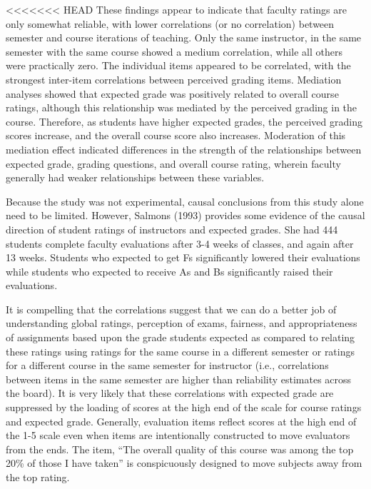\documentclass[man]{apa6}
\theoremstyle{definition}
\theoremstyle{definition}
\theoremstyle{definition}
\theoremstyle{remark}
\begin{document}
<<<<<<< HEAD
These findings appear to indicate that faculty ratings are only somewhat
reliable, with lower correlations (or no correlation) between semester
and course iterations of teaching. Only the same instructor, in the same
semester with the same course showed a medium correlation, while all
others were practically zero. The individual items appeared to be
correlated, with the strongest inter-item correlations between perceived
grading items. Mediation analyses showed that expected grade was
positively related to overall course ratings, although this relationship
was mediated by the perceived grading in the course. Therefore, as
students have higher expected grades, the perceived grading scores
increase, and the overall course score also increases. Moderation of
this mediation effect indicated differences in the strength of the
relationships between expected grade, grading questions, and overall
course rating, wherein faculty generally had weaker relationships
between these variables.

Because the study was not experimental, causal conclusions from this
study alone need to be limited. However, Salmons (1993) provides some
evidence of the causal direction of student ratings of instructors and
expected grades. She had 444 students complete faculty evaluations after
3-4 weeks of classes, and again after 13 weeks. Students who expected to
get Fs significantly lowered their evaluations while students who
expected to receive As and Bs significantly raised their evaluations.

It is compelling that the correlations suggest that we can do a better
job of understanding global ratings, perception of exams, fairness, and
appropriateness of assignments based upon the grade students expected as
compared to relating these ratings using ratings for the same course in
a different semester or ratings for a different course in the same
semester for instructor (i.e., correlations between items in the same
semester are higher than reliability estimates across the board). It is
very likely that these correlations with expected grade are suppressed
by the loading of scores at the high end of the scale for course ratings
and expected grade. Generally, evaluation items reflect scores at the
high end of the 1-5 scale even when items are intentionally constructed
to move evaluators from the ends. The item, \enquote{The overall quality
of this course was among the top 20\% of those I have taken} is
conspicuously designed to move subjects away from the top rating.
\end{document}
